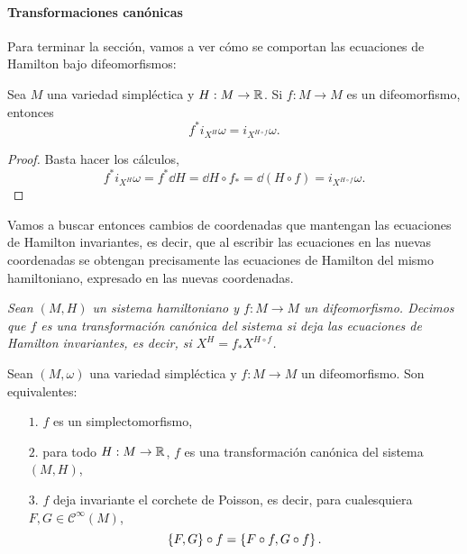 \paragraph{\bf Transformaciones canónicas}\mbox{}

  Para terminar la sección, vamos a ver cómo se comportan las ecuaciones de Hamilton bajo difeomorfismos:
  \begin{prop}\label{cambiodif}
 Sea $M$ una variedad simpléctica y $H:M\rightarrow \mathbb{R}$. Si $f:M\rightarrow M$ es un difeomorfismo, entonces 
 \begin{equation*}
   f^*i_{X^H}\omega=i_{X^{H\circ f}}\omega.
 \end{equation*}
\end{prop}
\begin{proof}
  Basta hacer los cálculos,
  \begin{equation*}
    f^*i_{X^H}\omega=f^*\dd H=\dd H \circ f_* = \dd (H\circ f)=i_{X^{H\circ f}}\omega.
  \end{equation*}
\end{proof}
Vamos a buscar entonces cambios de coordenadas que mantengan las ecuaciones de Hamilton invariantes, es decir, que al escribir las ecuaciones en las nuevas coordenadas se obtengan precisamente las ecuaciones de Hamilton del mismo hamiltoniano, expresado en las nuevas coordenadas.
\begin{defn}
  \em
  Sean $(M,H)$ un sistema hamiltoniano y $f:M\rightarrow M$ un difeomorfismo. Decimos que $f$ es una \emph{transformación canónica} del sistema si deja las ecuaciones de Hamilton invariantes, es decir, si $X^H=f_*X^{H\circ f}$.
\end{defn}

\begin{prop}\label{cambiohamilton}
  Sean $(M,\omega)$ una variedad simpléctica y $f:M\rightarrow M$ un difeomorfismo. Son equivalentes:
  \begin{enumerate}
    \item[$1$.] $f$ es un simplectomorfismo,
    \item[$2$.] para todo $H:M\rightarrow \mathbb{R}$, $f$ es una transformación canónica del sistema $(M,H)$,
    \item[$3$.] $f$ deja invariante el corchete de Poisson, es decir, para cualesquiera $F,G\in \mathscr{C}^{\infty}(M)$, 
      \begin{equation*}
	\left\lbrace F,G\right\rbrace\circ f=\left\lbrace F\circ f,G\circ f\right\rbrace.
      \end{equation*}
  \end{enumerate}
\end{prop}

